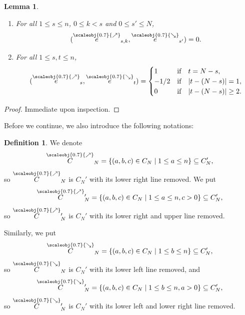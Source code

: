 \documentclass[11pt, reqno]{amsart}
\newtheorem{lemma}[theorem]{Lemma}
\theoremstyle{definition}
\newtheorem{defn}[theorem]{Definition}
\numberwithin{equation}{section}
\newcommand{\nears}{\scaleobj{0.7}{\nearrow}}
\newcommand{\sears}{\scaleobj{0.7}{\searrow}}
\newcommand{\nee}{\overset{\nears}{e}}
\newcommand{\seee}{\overset{\sears}{e}}
\newcommand{\neC}{\overset{\nears}{C}}
\newcommand{\seC}{\overset{\sears}{C}}
\newcommand{\wneC}{\overset{\nears}{C}\,\!'}
\newcommand{\wseC}{\overset{\sears}{C}\,\!'}
\begin{document}
\begin{lemma}
\begin{enumerate}
\begin{equation}
\end{equation}
\item For all $1\leq s\leq n$, $0\leq k < s$ and $0\leq s'\leq N$, 
\begin{equation}\label{EqDiffCarOpp}
(\nee_{s,k},\seee_{s'}) = 0.
\end{equation}
\item For all $1\leq s,t\leq n$,\begin{equation}\label{EqDiffCart}
(\nee_s,\seee_t) = \begin{cases}
1&\text{if}\quad t = N-s,\\
-1/2 & \text{if} \quad |t-(N-s)|=1,\\
0&  \text{if}\quad |t-(N-s)|\geq 2.
\end{cases}
\end{equation}
\end{enumerate}
\end{lemma}
\begin{proof}
Immediate upon inspection.
\end{proof}

Before we continue, we also introduce the following notations: 

\begin{defn}\label{DefCNOr}
We denote
\[
\neC_N = \{(a,b,c)\in C_N \mid 1\leq a \leq n\}\subseteq C_N', 
\]
so $\neC_N$ is $C_N'$ with its lower right line removed. We put 
\[
\wneC_N = \{(a,b,c)\in C_N \mid 1\leq a \leq n,c>0\}\subseteq C_N', 
\]
so $\wneC_N$ is $C_N'$ with its lower right and upper line removed.

Similarly, we put 
\[
\seC_N = \{(a,b,c)\in C_N \mid 1\leq b \leq n\}\subseteq C_N', 
\]
so $\seC_N$ is $C_N'$ with its lower left line removed, and 
\[
\wseC_N = \{(a,b,c)\in C_N \mid 1\leq b \leq n,a>0\}\subseteq C_N', 
\]
so $\wseC_N$ is $C_N'$ with its lower left and lower right line removed.
\end{defn}
\end{document}
